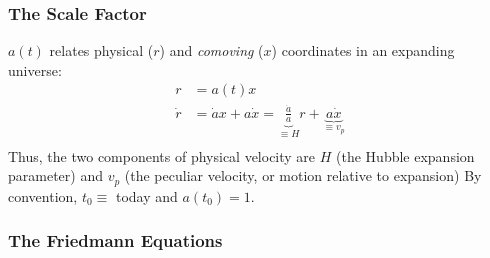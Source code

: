 \documentclass{article}
\def\aa{\frac{\dot a }{ a}}
\begin{document}
\subsubsection{ The Scale Factor }

$a(t)$ relates physical ($r$) and {\it comoving} ($x$) coordinates in an
expanding universe:
\begin{align}
r&=a(t)x\\
\dot r&=\dot ax+a\dot x=\underbrace{\aa}_{\equiv H}r+\underbrace{a\dot x}_{\equiv v_p}\\
\end{align}
Thus, the two components of physical velocity are $H$ (the Hubble expansion 
parameter) and $v_p$ (the peculiar velocity, or motion relative to expansion)
By convention, $t_0 \equiv$ today and $a(t_0)=1$.

\subsubsection{ The Friedmann Equations}
\end{document}
